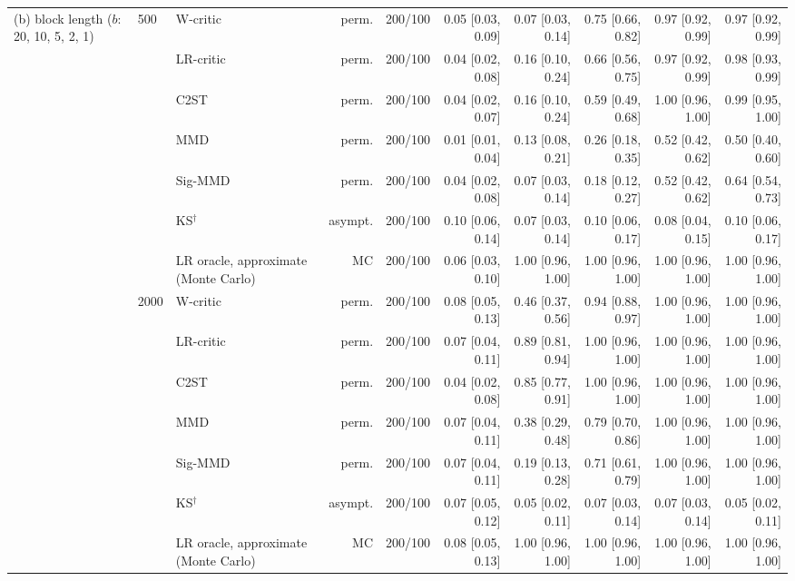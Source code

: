 \begin{tabular}{lllrrrrrrr}
(b) block length ($b$: 20, 10, 5, 2, 1) & 500 & W-critic & perm. & 200/100 & 0.05 [0.03, 0.09] & 0.07 [0.03, 0.14] & 0.75 [0.66, 0.82] & 0.97 [0.92, 0.99] & 0.97 [0.92, 0.99] \\
 &  & LR-critic & perm. & 200/100 & 0.04 [0.02, 0.08] & 0.16 [0.10, 0.24] & 0.66 [0.56, 0.75] & 0.97 [0.92, 0.99] & 0.98 [0.93, 0.99] \\
 &  & C2ST & perm. & 200/100 & 0.04 [0.02, 0.07] & 0.16 [0.10, 0.24] & 0.59 [0.49, 0.68] & 1.00 [0.96, 1.00] & 0.99 [0.95, 1.00] \\
 &  & MMD & perm. & 200/100 & 0.01 [0.01, 0.04] & 0.13 [0.08, 0.21] & 0.26 [0.18, 0.35] & 0.52 [0.42, 0.62] & 0.50 [0.40, 0.60] \\
 &  & Sig-MMD & perm. & 200/100 & 0.04 [0.02, 0.08] & 0.07 [0.03, 0.14] & 0.18 [0.12, 0.27] & 0.52 [0.42, 0.62] & 0.64 [0.54, 0.73] \\
 &  & KS$^{\dagger}$ & asympt. & 200/100 & 0.10 [0.06, 0.14] & 0.07 [0.03, 0.14] & 0.10 [0.06, 0.17] & 0.08 [0.04, 0.15] & 0.10 [0.06, 0.17] \\
 &  & LR oracle, approximate (Monte Carlo) & MC & 200/100 & 0.06 [0.03, 0.10] & 1.00 [0.96, 1.00] & 1.00 [0.96, 1.00] & 1.00 [0.96, 1.00] & 1.00 [0.96, 1.00] \\
 & 2000 & W-critic & perm. & 200/100 & 0.08 [0.05, 0.13] & 0.46 [0.37, 0.56] & 0.94 [0.88, 0.97] & 1.00 [0.96, 1.00] & 1.00 [0.96, 1.00] \\
 &  & LR-critic & perm. & 200/100 & 0.07 [0.04, 0.11] & 0.89 [0.81, 0.94] & 1.00 [0.96, 1.00] & 1.00 [0.96, 1.00] & 1.00 [0.96, 1.00] \\
 &  & C2ST & perm. & 200/100 & 0.04 [0.02, 0.08] & 0.85 [0.77, 0.91] & 1.00 [0.96, 1.00] & 1.00 [0.96, 1.00] & 1.00 [0.96, 1.00] \\
 &  & MMD & perm. & 200/100 & 0.07 [0.04, 0.11] & 0.38 [0.29, 0.48] & 0.79 [0.70, 0.86] & 1.00 [0.96, 1.00] & 1.00 [0.96, 1.00] \\
 &  & Sig-MMD & perm. & 200/100 & 0.07 [0.04, 0.11] & 0.19 [0.13, 0.28] & 0.71 [0.61, 0.79] & 1.00 [0.96, 1.00] & 1.00 [0.96, 1.00] \\
 &  & KS$^{\dagger}$ & asympt. & 200/100 & 0.07 [0.05, 0.12] & 0.05 [0.02, 0.11] & 0.07 [0.03, 0.14] & 0.07 [0.03, 0.14] & 0.05 [0.02, 0.11] \\
 &  & LR oracle, approximate (Monte Carlo) & MC & 200/100 & 0.08 [0.05, 0.13] & 1.00 [0.96, 1.00] & 1.00 [0.96, 1.00] & 1.00 [0.96, 1.00] & 1.00 [0.96, 1.00] \\
\bottomrule
\end{tabular}
